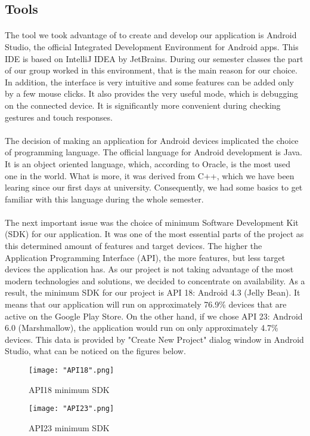 \documentclass[12pt]{article}
\begin{document}
\subsection{Tools}
\paragraph{} The tool we took advantage of to create and develop our application is Android Studio, the official Integrated Development Environment for Android apps. This IDE is based on IntelliJ IDEA by JetBrains. During our semester classes the part of our group worked in this environment, that is the main reason for our choice. In addition, the interface is very intuitive and some features can be added only by a few mouse clicks. It also provides the very useful mode, which is debugging on the connected device. It is significantly more convenient during checking gestures and touch responses.
\paragraph{} The decision of making an application for Android devices implicated the choice of programming language. The official language for Android development is Java. It is an object oriented language, which, according to Oracle, is the most used one in the world. What is more, it was derived from C++, which we have been learing since our first days at university. Consequently, we had some basics to get familiar with this language during the whole semester.
\paragraph{} The next important issue was the choice of minimum Software Development Kit (SDK) for our application. It was one of the most essential parts of the project as this determined amount of features and target devices. The higher the Application Programming Interface (API), the more features, but less target devices the application has. As our project is not taking advantage of the most modern technologies and solutions, we decided to concentrate on availability. As a result, the minimum SDK for our project is API 18: Android 4.3 (Jelly Bean). It means that our application will run on approximately 76.9\% devices that are active on the Google Play Store. 
On the other hand, if we chose API 23: Android 6.0 (Marshmallow), the application would run on only approximately 4.7\% devices. This data is provided by "Create New Project" dialog window in Android Studio, what can be noticed on the figures below.
\begin{figure}[H]
\texttt{[image: "API18".png]}
\caption{API18 minimum SDK}
\label{fig:API18}
\end{figure}
\begin{figure}[H]
\texttt{[image: "API23".png]}
\caption{API23 minimum SDK}
\label{fig:API23}
\end{figure}
\end{document}
